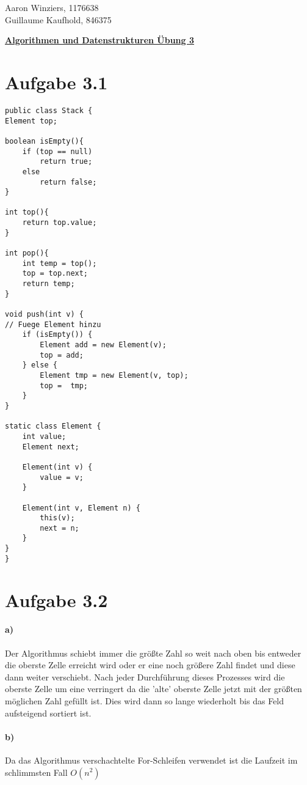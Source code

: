 \documentclass[10pt,a4paper]{article}
\begin{document}
	\begin{flushright}
		Aaron Winziers, 1176638	\\
		Guillaume Kaufhold, 846375
	\end{flushright}
	\begin{center}
		\underline{\textbf{Algorithmen und Datenstrukturen Übung 3}}
	\end{center}
	\section{Aufgabe 3.1}
\begin{lstlisting}
public class Stack {
Element top;

boolean isEmpty(){
	if (top == null)
		return true;
	else
		return false;
}

int top(){
	return top.value;
}

int pop(){
	int temp = top();
	top = top.next;
	return temp;
}

void push(int v) {
// Fuege Element hinzu
	if (isEmpty()) {
		Element add = new Element(v);
		top = add;
	} else {
		Element tmp = new Element(v, top);
		top =  tmp;
	}
}

static class Element {
	int value;
	Element next;

	Element(int v) {
		value = v;
	}
	
	Element(int v, Element n) {
		this(v);
		next = n;
	}
}
}
\end{lstlisting}
	
	\section{Aufgabe 3.2}
	\paragraph{a)} Der Algorithmus schiebt immer die größte Zahl so weit nach oben bis entweder die oberste Zelle erreicht wird oder er eine noch größere Zahl findet und diese dann weiter verschiebt. Nach jeder Durchführung dieses Prozesses wird die oberste Zelle um eine verringert da die 'alte' oberste Zelle jetzt mit der größten möglichen Zahl gefüllt ist. Dies wird dann so lange wiederholt bis das Feld aufsteigend sortiert ist.
	
	\paragraph{b)} Da das Algorithmus verschachtelte For-Schleifen verwendet ist die Laufzeit im schlimmsten Fall $O(n^{2})$
	
\end{document}
